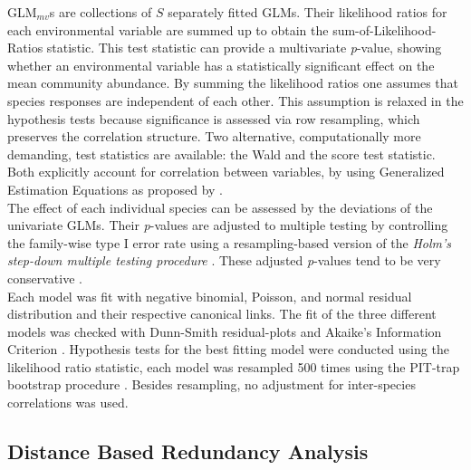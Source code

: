 		GLM$_{mv}$s are collections of $S$ separately fitted GLMs. 
		Their likelihood ratios for each environmental variable are summed up to obtain the sum-of-Likelihood-Ratios statistic. 
		This test statistic can provide a multivariate \textit{p}-value, showing whether an environmental variable has a statistically significant effect on the mean community abundance. 
		By summing the likelihood ratios one assumes that species responses are independent of each other. 
		This assumption is relaxed in the hypothesis tests because significance is assessed via row resampling, which preserves the correlation structure. 
		Two alternative, computationally more demanding, test statistics are available: the Wald and the score test statistic. 
		Both explicitly account for correlation between variables, by using Generalized Estimation Equations as proposed by \citet{Warton2011a}.\\ 
		The effect of each individual species can be assessed by the deviations of the univariate GLMs. 
		Their \textit{p}-values are adjusted to multiple testing by controlling the family-wise type I error rate using a resampling-based version of the \textit{Holm's step-down multiple testing procedure} \citep{Westfall1993}. 
		These adjusted \textit{p}-values tend to be very conservative \citep{Warton2018}. \\
		
		Each model was fit with negative binomial, Poisson, and normal residual distribution and their respective canonical links.
		The fit of the three different models was checked with Dunn-Smith residual-plots and Akaike's Information Criterion \citep[AIC, ][]{akaike1974new}.
		Hypothesis tests for the best fitting model were conducted using the likelihood ratio statistic, each model was resampled 500 times using the PIT-trap bootstrap procedure \citep{Warton2017}.
		Besides resampling, no adjustment for inter-species correlations was used.\\

	\subsection{Distance Based Redundancy Analysis}

